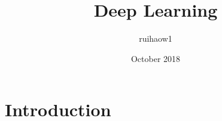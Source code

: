 \documentclass{article}
\title{Deep Learning}
\author{ruihaow1 }
\date{October 2018}
\begin{document}
\maketitle

\section{Introduction}
\end{document}
